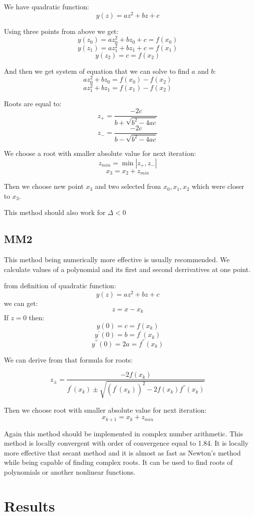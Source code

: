 \documentclass[12pt]{report}
\begin{document}
We have quadratic function:
\[ y(z) = az^2 + bz + c \]

Using three points from above we get:
\[ y(z_0) = az_0^2 + bz_0 + c = f(x_0) \]
\[ y(z_1) = az_1^2 + bz_1 + c = f(x_1) \]
\[ y(z_2) = c = f(x_2) \]

And then we get system of equation that we can solve to find $a$ and $b$:
\[ az_0^2 + bz_0 = f(x_0) - f(x_2) \]
\[ az_1^2 + bz_1 = f(x_1) - f(x_2) \]

Roots are equal to:
\[ z_+ = \frac{-2c}{b+\sqrt{b^2 - 4ac}} \]
\[ z_- = \frac{-2c}{b-\sqrt{b^2 - 4ac}} \]

We choose a root with smaller absolute value for next iteration:
\[ z_{min} = \min{|z_+, z_-|} \]
\[ x_3 = x_2 + z_{min} \]

Then we choose new point $x_3$ and two selected from $x_0, x_1, x_2$ which were closer to $x_3$.

This method should also work for $\Delta < 0 $


\subsection{MM2}
This method being numerically more effective is usually recommended.
We calculate values of a polynomial and its first and second derrivatives at one point.

from definition of quadratic function:
\[ y(z) = az^2 + bz + c \]
we can get:
\[ z = x - x_k \]
If $z = 0$ then:
\[ y(0) = c = f(x_k) \]
\[ y^{'}(0) = b = f^{'}(x_k) \]
\[ y^{''}(0) = 2a = f^{''}(x_k) \]

We can derive from that formula for roots:

\[ z_{\pm} = \frac{-2f(x_k)}{f^{'}(x_k) \pm \sqrt{ (f^{'}(x_k))^2 - 2f(x_k)f^{''}(x_k)}}\]

Then we choose root with smaller absolute value for next iteration:
\[ x_{k+1} = x_k + z_{min} \]

Again this method should be implemented in complex number arithmetic.
This method is locally convergent with order of convergence equal to 1.84. It is locally more effective that secant method and it is almost as fast as Newton's method while being capable of finding complex roots. It can be used to find roots of polynomials or another nonlinear functions.

\section{Results}
\end{document}
